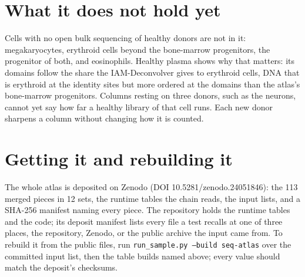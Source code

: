 \section{What it does not hold yet}

Cells with no open bulk sequencing of healthy donors are not in it: megakaryocytes, erythroid cells beyond the bone-marrow progenitors, the progenitor of both, and eosinophils. Healthy plasma shows why that matters: its domains follow the share the IAM-Deconvolver gives to erythroid cells, DNA that is erythroid at the identity sites but more ordered at the domains than the atlas's bone-marrow progenitors. Columns resting on three donors, such as the neurons, cannot yet say how far a healthy library of that cell runs. Each new donor sharpens a column without changing how it is counted.

\section{Getting it and rebuilding it}

The whole atlas is deposited on Zenodo (DOI 10.5281/zenodo.24051846): the 113 merged pieces in 12 sets, the runtime tables the chain reads, the input lists, and a SHA-256 manifest naming every piece. The repository holds the runtime tables and the code; its deposit manifest lists every file a test recalls at one of three places, the repository, Zenodo, or the public archive the input came from. To rebuild it from the public files, run \texttt{run\_sample.py --build seq-atlas} over the committed input list, then the table builds named above; every value should match the deposit's checksums.

